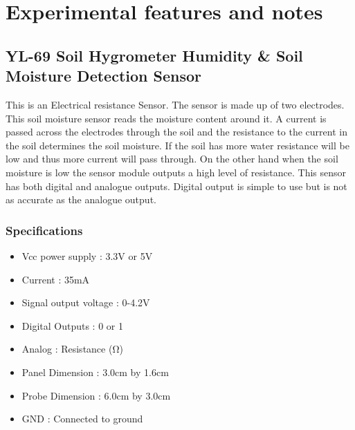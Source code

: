 \documentclass[16pt]{article}
\begin{document}
\vspace{10.5cm}

\vspace{19cm}
\section{Experimental features and notes}

\vspace{0.5cm}



\subsection{YL-69 Soil Hygrometer Humidity \& Soil Moisture Detection Sensor}


\vspace{0.3cm}
This is an Electrical resistance Sensor. The sensor is made up of two
electrodes. This soil moisture sensor reads the moisture content around
it. A current is passed across the electrodes through the soil and the
resistance to the current in the soil determines the soil moisture. If
the soil has more water resistance will be low and thus more current
will pass through. On the other hand when the soil moisture is low the
sensor module outputs a high level of resistance. This sensor has both
digital and analogue outputs. Digital output is simple to use but is not
as accurate as the analogue output.




\vspace{0.5cm}

\subsubsection{Specifications}

\begin{itemize}

\item
  Vcc power supply : 3.3V or 5V
\item
  Current : 35mA
\item
  Signal output voltage : 0-4.2V
\item
  Digital Outputs : 0 or 1
\item
  Analog : Resistance (Ω)
\item
  Panel Dimension : 3.0cm by 1.6cm
\item
  Probe Dimension : 6.0cm by 3.0cm
\item
  GND : Connected to ground
\end{itemize}
\end{document}
